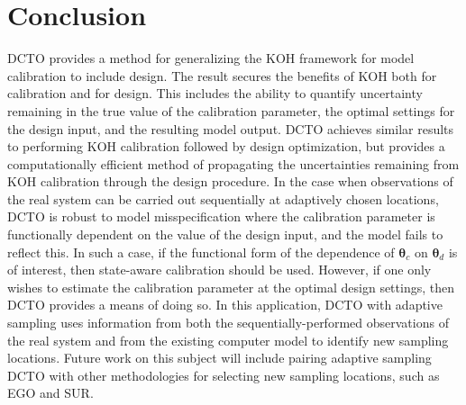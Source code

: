 \documentclass[12pt]{article}
\begin{document}
\section{Conclusion}\label{sec:conclusion}
%
DCTO provides a method for generalizing the KOH framework for model calibration to include design.
%
The result secures the benefits of KOH both for calibration and for design.
%
This includes the ability to quantify uncertainty remaining in the true value of the calibration parameter, the optimal settings for the design input, and the resulting model output.
%
DCTO achieves similar results to performing KOH calibration followed by design optimization, but provides a computationally efficient method of propagating the uncertainties remaining from KOH calibration through the design procedure.
%
In the case when observations of the real system can be carried out sequentially at adaptively chosen locations, DCTO is robust to model misspecification where the calibration parameter is functionally dependent on the value of the design input, and the model fails to reflect this.
%
In such a case, if the functional form of  the dependence of $\boldsymbol\theta_c$ on $\boldsymbol\theta_d$ is of interest, then state-aware calibration should be used.
%
However, if one only wishes to estimate the calibration parameter at the optimal design settings, then DCTO provides a means of doing so.
%
In this application, DCTO with adaptive sampling uses information from both the sequentially-performed observations of the real system and from the existing computer model to identify new sampling locations.
%
Future work on this subject will include pairing adaptive sampling DCTO with other methodologies for selecting new sampling locations, such as EGO and SUR.
%


\bigskip

%
%
%
%




\end{document}
